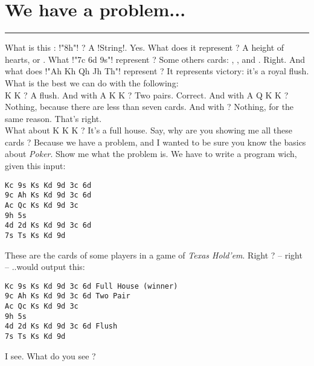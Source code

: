 \newpage
\section{We have a problem...} %
\vspace{10cm}
\hrule

\lhright What is this : \il!"8h"! ?
\lhleft A \il!String!.
\lhnext Yes. What does it represent ?
\lhleft A height of hearts, or .
\lhnext What \il!"7c 6d 9s"! represent ?
\lhleft Some others cards: , , and .
\lhnext Right. And what does \il!"Ah Kh Qh Jh Th"! represent ?
\lhleft It represents victory: it's a royal flush.
\lhnext What is the best we can do with the following: \\
   \spades K \diamonds K    ?
\lhleft A flush.
\lhnext And with  \hearts A \spades K \diamonds K    ?
\lhleft Two pairs.
\lhnext Correct. And with \clubs A \clubs Q \spades K \diamonds K   ?
\lhleft Nothing, because there are less than seven cards.
\lhnext And with   ?
\lhleft Nothing, for the same reason.
\lhnext That's right. \\
What about \clubs K  \spades K \diamonds K     ?
\lhleft It's a full house. Say, why are you showing me all these cards ?
\lhnext Because we have a problem, and I wanted to be sure you know the basics about \emph{Poker}.
\lhleft Show me what the problem is.
\lhnext We have to write a program wich, given this input:
\begin{verbatim}
Kc 9s Ks Kd 9d 3c 6d
9c Ah Ks Kd 9d 3c 6d
Ac Qc Ks Kd 9d 3c
9h 5s
4d 2d Ks Kd 9d 3c 6d
7s Ts Ks Kd 9d
\end{verbatim}
\hspace*{\fill} 
\lhleft These are the cards of some players in a game of \emph{Texas Hold'em}. Right ?
\lhnext -- right -- ..would output this:
\begin{verbatim}
Kc 9s Ks Kd 9d 3c 6d Full House (winner)
9c Ah Ks Kd 9d 3c 6d Two Pair
Ac Qc Ks Kd 9d 3c 
9h 5s 
4d 2d Ks Kd 9d 3c 6d Flush
7s Ts Ks Kd 9d 
\end{verbatim}
\hspace*{\fill} 
\lhleft I see. 
\lhnext What do you see ?

